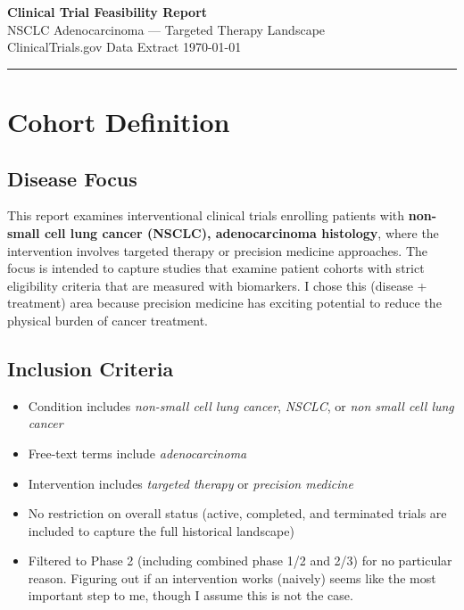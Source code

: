 \documentclass[11pt, letterpaper]{article}
\begin{document}
\begin{center}
  {\LARGE\bfseries Clinical Trial Feasibility Report}\\[6pt]
  {\large NSCLC Adenocarcinoma — Targeted Therapy Landscape}\\[4pt]
  {\small\color{gray} ClinicalTrials.gov Data Extract \textbar{} \today}
\end{center}

\vspace{16pt}
\hrule
\vspace{16pt}

\section{Cohort Definition}

\subsection{Disease Focus}

This report examines interventional clinical trials enrolling patients with
\textbf{non-small cell lung cancer (NSCLC), adenocarcinoma histology}, where
the intervention involves targeted therapy or precision medicine approaches.
The focus is intended to capture studies that examine patient cohorts with 
strict eligibility criteria that are measured with biomarkers. I chose this 
(disease + treatment) area because precision medicine has exciting potential 
to reduce the physical burden of cancer treatment.
\subsection{Inclusion Criteria}

\begin{itemize}
  \item Condition includes \textit{non-small cell lung cancer}, \textit{NSCLC},
        or \textit{non small cell lung cancer}
  \item Free-text terms include \textit{adenocarcinoma}
  \item Intervention includes \textit{targeted therapy} or
        \textit{precision medicine}
  \item No restriction on overall status (active, completed, and terminated
        trials are included to capture the full historical landscape)
  \item Filtered to Phase 2 (including combined phase 1/2 and 2/3) for no 
        particular reason. Figuring out if an intervention works (naively) seems 
        like the most important step to me, though I assume this is not the case.
\end{itemize}
\end{document}
